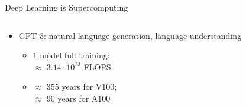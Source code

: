 \begin{frame}{Deep Learning is Supercomputing}
\protect\hypertarget{deep-learning-is-supercomputing-6}{}
\begin{columns}[T]
\begin{column}{0.4\textwidth}
\begin{itemize}
\tightlist
\item
  GPT-3: natural language generation, language understanding

  \begin{itemize}
  \tightlist
  \item
    1 model full training:\\
    \(\approx\) \(3.14\cdot 10^{23}\) FLOPS
  \item
    \(\approx\) 355 years for V100;\\
    \(\approx\) 90 years for A100
  \end{itemize}
\end{itemize}
\end{column}

\begin{column}{0.6\textwidth}
\vspace*{2cm}
\end{column}
\end{columns}
\end{frame}

